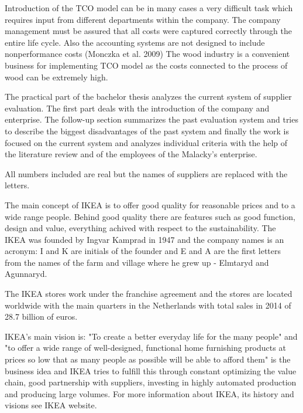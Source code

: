 \documentclass[oneside,12pt]{article}%
\begin{document}
Introduction of the TCO model can be in many cases a very difficult task which requires input from different departments within the company. The company management must be assured that all costs were captured correctly through the entire life cycle. Also the accounting systems are not designed to include nonperformance costs (Monczka et al. 2009) The wood industry is a convenient business for implementing TCO model as the costs connected to the process of wood can be extremely high.





The practical part of the bachelor thesis analyzes the current system of supplier evaluation. The first part deals with the introduction of the company and enterprise. The follow-up section summarizes the past evaluation system and tries to describe the biggest disadvantages of the past system and finally the work is focused on the current system and analyzes individual criteria with the help of the literature review and of the employees of the Malacky’s enterprise. \par
All numbers included are real but the names of suppliers are replaced with the letters.

The main concept of IKEA is to offer good quality for reasonable prices and to a wide range people. Behind good quality there are features such as good function, design and value, everything achived with respect to the sustainability. The IKEA was founded by Ingvar Kamprad in 1947 and the company names is an acronym: I and K are initials of the founder and E and A are the first letters from the names of the farm and village where he grew up - Elmtaryd and Agunnaryd. \par
The IKEA stores work under the franchise agreement and the stores are located worldwide with the main quarters in the Netherlands with total sales in 2014 of 28.7 billion of euros. \par
IKEA’s main vision is: "To create a better everyday life for the many people" and "to offer a wide range of well-designed, functional home furnishing products at prices so low that as many people as possible will be able to afford them" is the business idea and IKEA tries to fulfill this through constant optimizing the value chain, good partnership with suppliers, investing in highly automated production and producing large volumes. For more information about IKEA, its history and visions see IKEA website.
\end{document}
